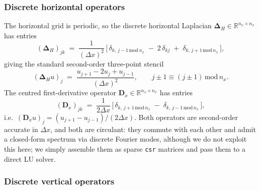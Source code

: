\documentclass{article}
\begin{document}
\subsubsection{Discrete horizontal operators}

The horizontal grid is periodic, so the discrete horizontal Laplacian $\bm{\Delta}_H \in \mathbb{R}^{n_x \times n_x}$ has entries
\begin{equation}
    (\bm{\Delta}_H)_{jk} \;=\; \frac{1}{(\Delta x)^2}\,\big[\,\delta_{k,\,j-1 \,\mathrm{mod}\, n_x} \;-\; 2\,\delta_{kj} \;+\; \delta_{k,\,j+1\,\mathrm{mod}\, n_x}\,\big], \label{eq:Delta_H_entries}
\end{equation}
giving the standard second-order three-point stencil
\begin{equation}
    (\bm{\Delta}_H u)_j \;=\; \frac{u_{j+1} - 2 u_j + u_{j-1}}{(\Delta x)^2}, \qquad j \pm 1 \equiv (j\pm 1)\,\mathrm{mod}\, n_x. \label{eq:Delta_H_stencil}
\end{equation}
The centred first-derivative operator $\bm{D}_x \in \mathbb{R}^{n_x \times n_x}$ has entries
\begin{equation}
    (\bm{D}_x)_{jk} \;=\; \frac{1}{2\Delta x}\,\big[\,\delta_{k,\,j+1\,\mathrm{mod}\, n_x} \;-\; \delta_{k,\,j-1\,\mathrm{mod}\, n_x}\,\big], \label{eq:Dx_entries}
\end{equation}
i.e.\ $(\bm{D}_x u)_j = (u_{j+1} - u_{j-1})/(2\Delta x)$.
Both operators are second-order accurate in $\Delta x$, and both are circulant: they commute with each other and admit a closed-form spectrum via discrete Fourier modes, although we do not exploit this here; we simply assemble them as sparse \texttt{csr} matrices and pass them to a direct LU solver.

\subsubsection{Discrete vertical operators}
\end{document}
